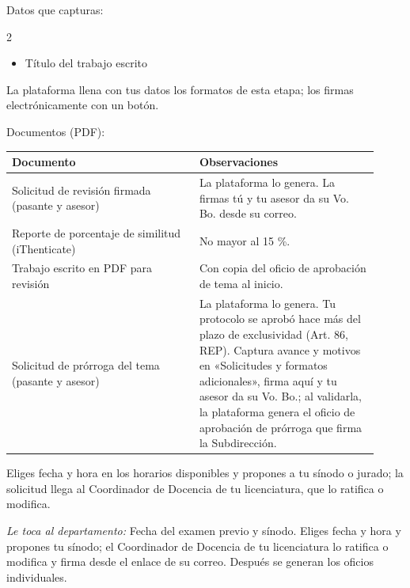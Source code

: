 Datos que capturas:
\begin{multicols}{2}\small
\begin{itemize}
  \item Título del trabajo escrito
\end{itemize}
\end{multicols}

La plataforma llena con tus datos los formatos de esta etapa; los firmas electrónicamente con un botón.

Documentos (PDF):
{\small\begin{longtable}{>{\raggedright\arraybackslash}p{0.47\linewidth}>{\raggedright\arraybackslash}p{0.45\linewidth}}
\toprule
\textbf{Documento} & \textbf{Observaciones}\\
\midrule
\endhead
Solicitud de revisión firmada (pasante y asesor) & La plataforma lo genera. La firmas tú y tu asesor da su Vo. Bo. desde su correo.\\
Reporte de porcentaje de similitud (iThenticate) & No mayor al 15 \%.\\
Trabajo escrito en PDF para revisión & Con copia del oficio de aprobación de tema al inicio.\\
Solicitud de prórroga del tema (pasante y asesor) & La plataforma lo genera. Tu protocolo se aprobó hace más del plazo de exclusividad (Art. 86, REP). Captura avance y motivos en «Solicitudes y formatos adicionales», firma aquí y tu asesor da su Vo. Bo.; al validarla, la plataforma genera el oficio de aprobación de prórroga que firma la Subdirección.\\
\bottomrule
\end{longtable}}

Eliges fecha y hora en los horarios disponibles y propones a tu sínodo o jurado; la solicitud llega al Coordinador de Docencia de tu licenciatura, que lo ratifica o modifica.

\emph{Le toca al departamento:} Fecha del examen previo y sínodo. Eliges fecha y hora y propones tu sínodo; el Coordinador de Docencia de tu licenciatura lo ratifica o modifica y firma desde el enlace de su correo. Después se generan los oficios individuales.
